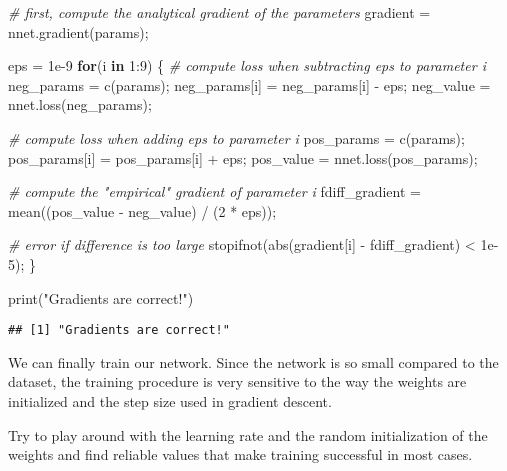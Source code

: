 \documentclass[
  a4paper,
]{article}
\newenvironment{Shaded}{\begin{snugshade}}{\end{snugshade}}
\newcommand{\CommentTok}[1]{\textcolor[rgb]{0.56,0.35,0.01}{\textit{#1}}}
\newcommand{\ControlFlowTok}[1]{\textcolor[rgb]{0.13,0.29,0.53}{\textbf{#1}}}
\newcommand{\DecValTok}[1]{\textcolor[rgb]{0.00,0.00,0.81}{#1}}
\newcommand{\FloatTok}[1]{\textcolor[rgb]{0.00,0.00,0.81}{#1}}
\newcommand{\FunctionTok}[1]{\textcolor[rgb]{0.00,0.00,0.00}{#1}}
\newcommand{\NormalTok}[1]{#1}
\newcommand{\OtherTok}[1]{\textcolor[rgb]{0.56,0.35,0.01}{#1}}
\newcommand{\SpecialCharTok}[1]{\textcolor[rgb]{0.00,0.00,0.00}{#1}}
\newcommand{\StringTok}[1]{\textcolor[rgb]{0.31,0.60,0.02}{#1}}
\begin{document}
\begin{Shaded}
\begin{Highlighting}[]
\CommentTok{\# first, compute the analytical gradient of the parameters}
\NormalTok{gradient }\OtherTok{=} \FunctionTok{nnet.gradient}\NormalTok{(params);}

\NormalTok{eps }\OtherTok{=} \FloatTok{1e{-}9}
\ControlFlowTok{for}\NormalTok{(i }\ControlFlowTok{in} \DecValTok{1}\SpecialCharTok{:}\DecValTok{9}\NormalTok{) \{}
  \CommentTok{\# compute loss when subtracting eps to parameter i}
\NormalTok{  neg\_params }\OtherTok{=} \FunctionTok{c}\NormalTok{(params);}
\NormalTok{  neg\_params[i] }\OtherTok{=}\NormalTok{ neg\_params[i] }\SpecialCharTok{{-}}\NormalTok{ eps;}
\NormalTok{  neg\_value }\OtherTok{=} \FunctionTok{nnet.loss}\NormalTok{(neg\_params);}
  
  \CommentTok{\# compute loss when adding eps to parameter i}
\NormalTok{  pos\_params }\OtherTok{=} \FunctionTok{c}\NormalTok{(params);}
\NormalTok{  pos\_params[i] }\OtherTok{=}\NormalTok{ pos\_params[i] }\SpecialCharTok{+}\NormalTok{ eps;}
\NormalTok{  pos\_value }\OtherTok{=} \FunctionTok{nnet.loss}\NormalTok{(pos\_params);}

  \CommentTok{\# compute the "empirical" gradient of parameter i}
\NormalTok{  fdiff\_gradient }\OtherTok{=} \FunctionTok{mean}\NormalTok{((pos\_value }\SpecialCharTok{{-}}\NormalTok{ neg\_value) }\SpecialCharTok{/}\NormalTok{ (}\DecValTok{2} \SpecialCharTok{*}\NormalTok{ eps));}
  
  \CommentTok{\# error if difference is too large}
  \FunctionTok{stopifnot}\NormalTok{(}\FunctionTok{abs}\NormalTok{(gradient[i] }\SpecialCharTok{{-}}\NormalTok{ fdiff\_gradient) }\SpecialCharTok{\textless{}} \FloatTok{1e{-}5}\NormalTok{);}
\NormalTok{\}}

\FunctionTok{print}\NormalTok{(}\StringTok{"Gradients are correct!"}\NormalTok{)}
\end{Highlighting}
\end{Shaded}

\begin{verbatim}
## [1] "Gradients are correct!"
\end{verbatim}

We can finally train our network. Since the network is so small compared
to the dataset, the training procedure is very sensitive to the way the
weights are initialized and the step size used in gradient descent.

Try to play around with the learning rate and the random initialization
of the weights and find reliable values that make training successful in
most cases.
\end{document}
